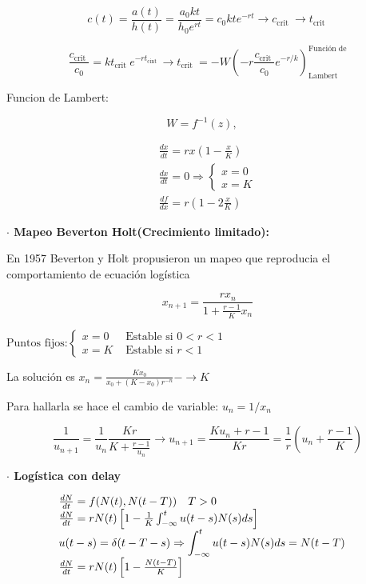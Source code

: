 \documentclass[%
 reprint,
 amsmath,amssymb,
 aps,
]{revtex4-1}
\begin{document}
$$c(t)=\frac{a(t)}{h(t)}=\frac{a_{0} k t}{h_{0} e^{r t}}=c_{0} k t e^{-r t} \longrightarrow c_{\text {crit }} \rightarrow t_{\text {crit }}$$

$$
\frac{c_{\text {crit }}}{c_{0}}=k t_{\text {crit }} e^{-r t_{\text {cint }}} \rightarrow t_{\text {crit }}=-W\left(-r \frac{c_{\text {crit }}}{c_{0}} e^{-r / k}\right) ^\text {Función de} _\text {Lambert}
$$

Funcion de Lambert:

$$W=f^{-1}(z),\quad $$

$$
\begin{array}{l}
\frac{d x}{d t}=r x\left(1-\frac{x}{K}\right) \\
\frac{d x}{d t}=0 \Rightarrow\left\{\begin{array}{l}
x=0 \\
x=K
\end{array}\right. \\
\frac{d f}{d x}=r\left(1-2 \frac{x}{K}\right)
\end{array}
$$

\textbf{$\cdot$ Mapeo Beverton Holt(Crecimiento limitado):}

En 1957 Beverton y Holt propusieron un mapeo que reproducia el comportamiento de ecuación logística


$$
x_{n+1}=\frac{r x_{n}}{1+\frac{r-1}{K} x_{n}}$$


$
\text{Puntos fijos:}
\left\{
\begin{array}{ll}
  x=0 & \text { Estable si } 0<r<1 \\ 
  x=K & \text { Estable si } r<1
\end{array}
\right.$ 


La solución es $x_{n}=\frac{K x_{0}}{x_{0}+\left(K-x_{0}\right) r^{-n}}-\rightarrow K$

Para hallarla se hace el cambio de variable:
$
u_{n}=1 / x_{n}
$

$$
\frac{1}{u_{n+1}}=\frac{1}{u_{n}} \frac{K r}{K+\frac{r-1}{u_{n}}} \longrightarrow u_{n+1}=\frac{K u_{n}+r-1}{K r}=\frac{1}{r}\left(u_{n}+\frac{r-1}{K}\right)
$$

\textbf{$\cdot$ Logística con delay }

$$
\begin{aligned}\centering
&\begin{array}{l}
\frac{d N}{d t}=f(N(t), N(t-T)) \quad T>0 \\
\frac{d N}{d t}=r N(t)\left[1-\frac{1}{K} \int_{-\infty}^{t} u(t-s) N(s) d s\right] \\
\begin{aligned}
u(t-s)=\delta(t-T-s) \Rightarrow \int_{-\infty}^{t} u(t-s) N(s) d s=N(t-T)
\end{aligned} \\
\frac{d N}{d t}=r N(t)\left[1-\frac{N(t-T)}{K}\right]
\end{array}
\end{aligned}
$$
\end{document}
